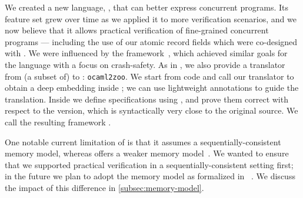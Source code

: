 We created a new \Iris language, \ZooLang, that can better express concurrent \OCaml programs. Its feature set grew over time as we applied it to more verification scenarios, and we now believe that it allows practical verification of fine-grained concurrent \OCamlFive programs --- including the use of our atomic record fields which were co-designed with \ZooLang.
We were influenced by the \Perennial framework~\citep*{DBLP:conf/sosp/ChajedTKZ19}, which achieved similar goals for the \Go language with a focus on crash-safety.
As in \Perennial, we also provide a translator from (a subset of) \OCaml to \ZooLang: \texttt{ocaml2zoo}. We start from \OCaml code and call our translator to obtain a deep \ZooLang embedding inside \Rocq; we can use lightweight annotations to guide the translation. Inside \Rocq we define specifications using \Iris, and prove them correct with respect to the \ZooLang version, which is syntactically very close to the original \OCaml source.
We call the resulting framework \Zoo.

One notable current limitation of \ZooLang is that it assumes a sequentially-consistent memory model, whereas \OCaml offers a weaker memory model~\citep*{ocaml-memory-model}. We wanted to ensure that we supported practical verification in a sequentially-consistent setting first; in the future we plan to adopt the \OCaml memory model as formalized in \Cosmo~\citep*{DBLP:journals/pacmpl/MevelJP20}. We discuss the impact of this difference in \cref{subsec:memory-model}.


